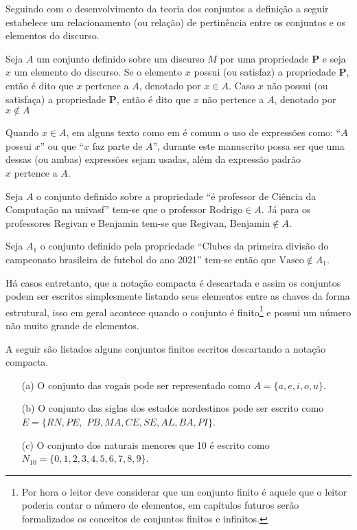 Seguindo com o desenvolvimento da teoria dos conjuntos a definição a seguir estabelece um relacionamento (ou relação) de pertinência entre os conjuntos e os elementos do discurso.

\begin{definition}[Pertinência]\label{def:Pertinencia}
	Seja $A$ um conjunto definido sobre um discurso $M$ por uma propriedade $\textbf{P}$ e seja $x$ um elemento do discurso. Se o elemento $x$ possui (ou satisfaz) a propriedade $\textbf{P}$, então é dito que $x$ pertence a $A$, denotado por $x \in A$. Caso $x$ não possui (ou satisfaça) a propriedade $\textbf{P}$, então é dito que $x$ não pertence a $A$, denotado por $x \notin A$
\end{definition}

\begin{rema}
	Quando $x \in A$, em alguns texto como em \cite{lipschutz1978-TC} é comum o uso de expressões como: ``$A$ possui $x$'' ou que ``$x$ faz parte de $A$'', durante este manuscrito possa ser que uma dessas (ou ambas) expressões sejam usadas, além da expressão padrão $x \mbox{ pertence a }  A$.
\end{rema}

\begin{exem}
	Seja $A$ o conjunto definido sobre a propriedade ``é professor de Ciência da Computação na univasf'' tem-se que o professor $\mbox{Rodrigo} \in A$. Já para os professores Regivan e Benjamin tem-se que $\mbox{Regivan, Benjamin} \notin A$. 
\end{exem}

\begin{exem}
	Seja $A_1$ o conjunto definido pela propriedade ``Clubes da primeira divisão do campeonato brasileira de futebol do ano 2021'' tem-se então que $\mbox{Vasco} \notin A_1$.
\end{exem}

Há casos entretanto, que a notação compacta é descartada e assim os conjuntos podem ser escritos simplesmente listando seus elementos entre as chaves da forma estrutural, isso em geral acontece quando o conjunto é finito\footnote{Por hora o leitor deve considerar que um conjunto finito é aquele que o leitor poderia contar o número de elementos, em capítulos futuros serão formalizados os conceitos de conjuntos finitos e infinitos.} e possui um número não muito grande de elementos.

\begin{exem}
	A seguir são listados alguns conjuntos finitos escritos descartando a notação compacta.
	\begin{itemize}
		\item[(a)] O conjunto das vogais pode ser representado como $A = \{a,e,i,o,u\}$.
		\item[(b)] O conjunto das siglas dos estados nordestinos pode ser escrito como $E = \{RN, PE,$ $PB, MA, CE, SE, AL, BA, PI\}$.
		\item[(c)] O conjunto dos naturais menores que 10 é escrito como $N_{10} = \{0, 1, 2, 3, 4, 5, 6, 7, 8, 9\}$.
	\end{itemize}
\end{exem}

